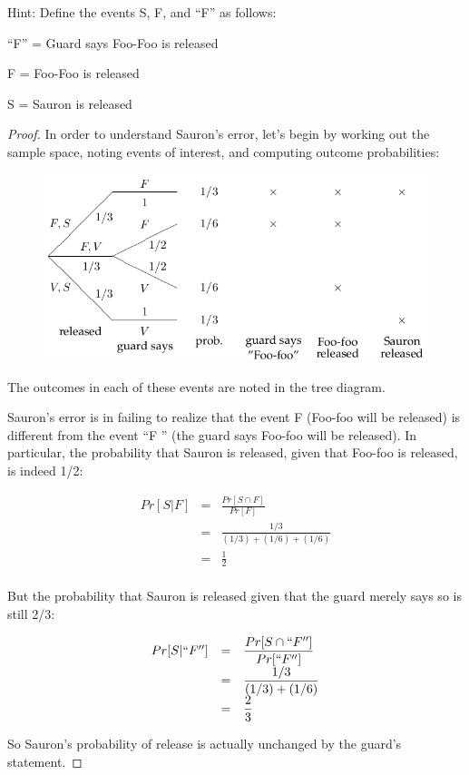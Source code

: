 \documentclass[14pt]{extarticle}
\newcommand{\dps}{\displaystyle}
\begin{document}
Hint: Define the events S, F, and “F” as follows:

“F” = Guard says Foo-Foo is released

F = Foo-Foo is released

S = Sauron is released

\begin{proof}
In order to understand Sauron's error, let’s begin by working out the sample space, noting events of interest, and computing outcome probabilities:

\begin{figure}[ht!]
\centering
\includegraphics[scale=0.5]{sauron.png}
\end{figure}

The outcomes in each of these events are noted in the tree diagram.

Sauron’s error is in failing to realize that the event F (Foo-foo will be released) is different from the event “F ” (the guard says Foo-foo will be released). In particular, the probability that Sauron is released, given that Foo-foo is released, is indeed 1/2:

$$
\begin{array}{rcl}
Pr[S|F] & = & \dps\frac{Pr[S \cap F]}{Pr[F]}\\
& = & \dps\frac{1/3}{(1/3)+(1/6)+(1/6)}\\
& = & \dps\frac{1}{2}\\
\end{array}
$$

But the probability that Sauron is released given that the guard merely says so is still 2/3:

$$
\begin{array}{rcl}
Pr[S| ``F''] & = & \dps\frac{Pr[S \cap ``F'']}{Pr[ ``F'']}\\
& = & \dps\frac{1/3}{(1/3)+(1/6)}\\
& = & \dps\frac{2}{3}\\
\end{array}
$$

So Sauron’s probability of release is actually unchanged by the guard’s statement.
\end{proof}
\end{document}
